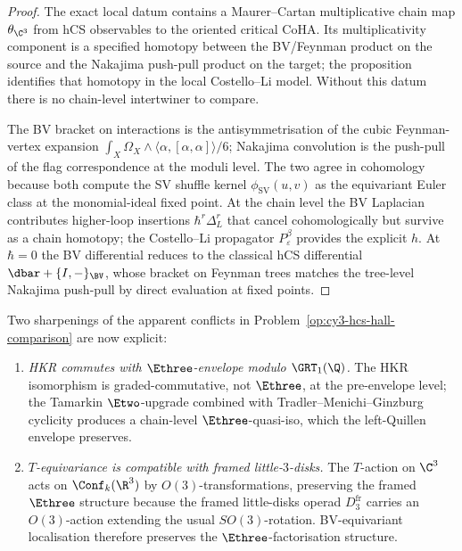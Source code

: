 \begin{proof}
The exact local datum contains a Maurer--Cartan multiplicative chain map
$\theta_{\C^3}$ from hCS observables to the oriented critical CoHA. Its
multiplicativity component is a specified homotopy between the
BV/Feynman product on the source and the Nakajima push-pull product on
the target; the proposition identifies that homotopy in the local
Costello--Li model. Without this datum there is no chain-level
intertwiner to compare.

The BV bracket on interactions is the antisymmetrisation of the cubic
Feynman-vertex expansion
$\int_X \Omega_X\wedge\langle\alpha,[\alpha,\alpha]\rangle/6$; Nakajima
convolution is the push-pull of the flag correspondence at the moduli
level. The two agree in cohomology because both compute the SV shuffle
kernel $\phi_{\mathrm{SV}}(u,v)$ as the equivariant Euler class at the
monomial-ideal fixed point. At the chain level the BV Laplacian
contributes higher-loop insertions $\hbar^r\Delta^r_L$ that cancel
cohomologically but survive as a chain homotopy; the Costello--Li
propagator $P^\beta_\varepsilon$ provides the explicit $h$. At
$\hbar=0$ the BV differential reduces to the classical hCS
differential $\dbar+\{I,-\}_{\BV}$, whose bracket on Feynman trees
matches the tree-level Nakajima push-pull by direct evaluation at
fixed points.
\end{proof}

\begin{remark}
\label{rem:r6-ghost-theorems-c3}
Two sharpenings of the apparent conflicts in
Problem~\ref{op:cy3-hcs-hall-comparison} are now explicit:
\begin{enumerate}
\item \emph{HKR commutes with $\Ethree$-envelope modulo
$\GRT_1(\Q)$.} The HKR isomorphism is graded-commutative, not
$\Ethree$, at the pre-envelope level; the Tamarkin $\Etwo$-upgrade
combined with Tradler--Menichi--Ginzburg cyclicity produces a
chain-level $\Ethree$-quasi-iso, which the left-Quillen envelope
preserves.
\item \emph{$T$-equivariance is compatible with framed little-$3$-disks.}
The $T$-action on $\C^3$ acts on $\Conf_k(\R^3)$ by
$O(3)$-transformations, preserving the framed $\Ethree$ structure
because the framed little-disks operad $D_3^{\mathrm{fr}}$ carries an
$O(3)$-action extending the usual $SO(3)$-rotation. BV-equivariant
localisation therefore preserves the $\Ethree$-factorisation structure.
\end{enumerate}
\end{remark}

